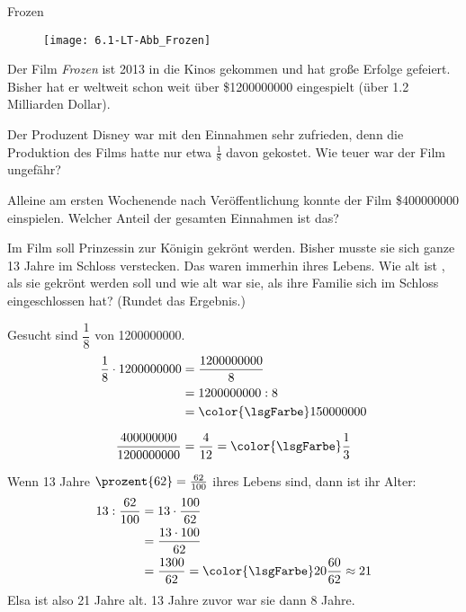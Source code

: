 \documentclass[lerntheke,12pt,a5paper,landscape]{arbeitsblatt}
\def\clrLsg{\color{\lsgFarbe}}
\begin{document}
	\begin{karte3}[\iconPartner]{Frozen}
		\begin{wrapfigure}[11]{r}{0pt}
			\texttt{[image: 6.1-LT-Abb\_Frozen]}
		\end{wrapfigure}

		Der Film \emph{Frozen} ist 2013 in die Kinos gekommen und hat große Erfolge gefeiert.
		Bisher hat er weltweit schon weit über \$\num{1200000000} eingespielt (über \num{1,2} Milliarden Dollar).

		\begin{enuma}\small
			\item Der Produzent Disney war mit den Einnahmen sehr zufrieden, denn die Produktion des Films hatte nur etwa $\tfrac{1}{8}$ davon gekostet. Wie teuer war der Film ungefähr?

			\item Alleine am ersten Wochenende nach Veröffentlichung konnte der Film \$\num{400000000} einspielen. Welcher Anteil der gesamten Einnahmen ist das?

			\item Im Film soll Prinzessin  zur Königin gekrönt werden. Bisher musste sie sich ganze \num{13} Jahre im Schloss verstecken. Das waren immerhin  ihres Lebens. Wie alt ist , als sie gekrönt werden soll und wie alt war sie, als ihre Familie sich im Schloss eingeschlossen hat? (Rundet das Ergebnis.)
		\end{enuma}

	\end{karte3}

	\begin{loesungskarte}
		\begin{multicols}{2}
		\begin{enuma}
			\item Gesucht sind $\dfrac{1}{8}$ von \num{1200000000}.
			\begin{align*}
				\frac{1}{8}\cdot 1200000000 &= \frac{1200000000}{8} \\
					&= 1200000000 : 8 \\
					&= \clrLsg 150000000
			\end{align*}

			\item
			\[ \frac{400000000}{1200000000} = \frac{4}{12} = \clrLsg\frac{1}{3} \]

			\item Wenn \num{13} Jahre $\prozent{62} = \tfrac{62}{100}$ ihres Lebens sind, dann ist ihr Alter:
			\begin{align*}
				13: \frac{62}{100} &= 13\cdot \frac{100}{62} \\
					&= \frac{13\cdot 100}{62} \\
					&= \frac{1300}{62} = \clrLsg 20\frac{60}{62}\approx 21
			\end{align*}
			Elsa ist also \num{21} Jahre alt. \num{13} Jahre zuvor war sie dann \num{8} Jahre.
		\end{enuma}
		\end{multicols}
	\end{loesungskarte}
\end{document}
